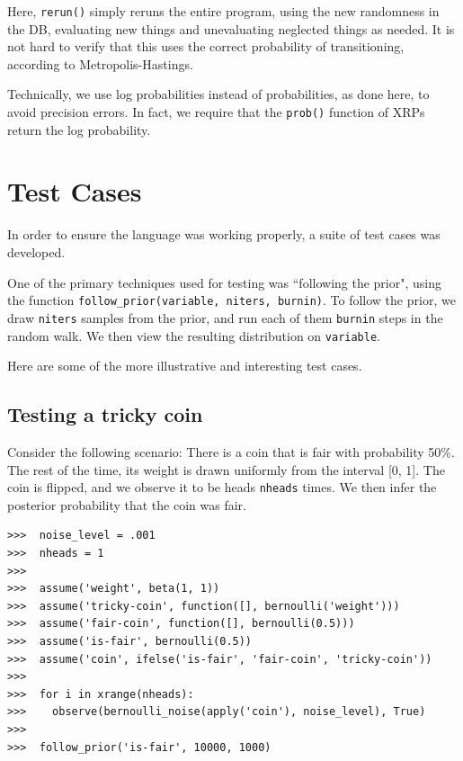 \documentclass[11pt]{article}
\begin{document}
\noindent Here, {\tt rerun()} simply reruns the entire program, using the new randomness in the DB, evaluating new things and unevaluating neglected things as needed.  It is not hard to verify that this uses the correct probability of transitioning, according to Metropolis-Hastings.  

Technically, we use log probabilities instead of probabilities, as done here, to avoid precision errors.  In fact, we require that the {\tt prob()} function of XRPs return the log probability.






\pagebreak

\section{Test Cases}

In order to ensure the language was working properly, a suite of test cases was developed.  

One of the primary techniques used for testing was ``following the prior", using the function {\tt follow\_prior(variable, niters, burnin)}.  To follow the prior, we draw {\tt niters} samples from the prior, and run each of them {\tt burnin} steps in the random walk.  We then view the resulting distribution on {\tt variable}.  %

Here are some of the more illustrative and interesting test cases.


\subsection{Testing a tricky coin}

Consider the following scenario:  There is a coin that is fair with probability 50\%.  The rest of the time, its weight is drawn uniformly from the interval [0, 1].  The coin is flipped, and we observe it to be heads {\tt nheads} times.  We then infer the posterior probability that the coin was fair. 

\begin{small}
\begin{verbatim}
>>>  noise_level = .001
>>>  nheads = 1
>>>  
>>>  assume('weight', beta(1, 1))
>>>  assume('tricky-coin', function([], bernoulli('weight')))
>>>  assume('fair-coin', function([], bernoulli(0.5)))
>>>  assume('is-fair', bernoulli(0.5))
>>>  assume('coin', ifelse('is-fair', 'fair-coin', 'tricky-coin')) 
>>>
>>>  for i in xrange(nheads):
>>>    observe(bernoulli_noise(apply('coin'), noise_level), True)
>>>
>>>  follow_prior('is-fair', 10000, 1000)
\end{verbatim}
\end{small}
\end{document}
